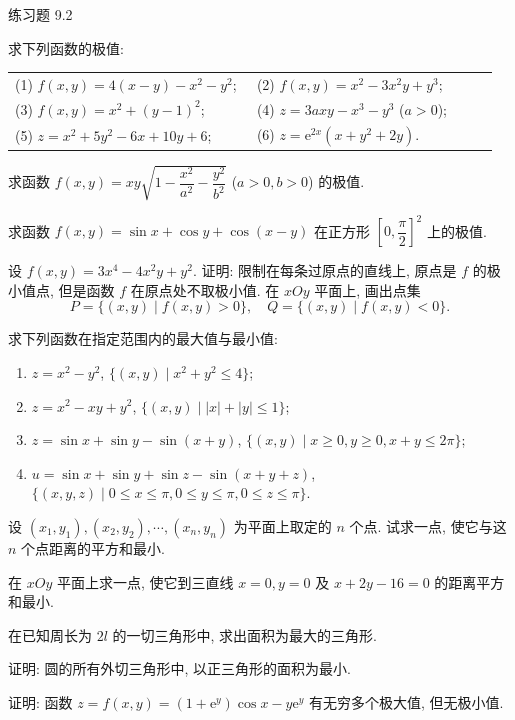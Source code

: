 \begin{exblock}{练习题 9.2}
  \item 求下列函数的极值:

  \begin{tabular}{@{}p{0.48\linewidth}p{0.48\linewidth}@{}}
    (1) $f(x, y) = 4(x - y) - x^{2} - y^{2}$; & (2) $f(x, y) = x^{2} - 3x^{2}y + y^{3}$; \\[4pt]
    (3) $f(x, y) = x^{2} + (y - 1)^{2}$; & (4) $z = 3axy - x^{3} - y^{3}$ ($a > 0$); \\[4pt]
    (5) $z = x^{2} + 5y^{2} - 6x + 10y + 6$; & (6) $z = \mathrm{e}^{2x}(x + y^{2} + 2y)$.
  \end{tabular}

  \item 求函数 $f(x, y) = xy \sqrt{1 - \dfrac{x^{2}}{a^{2}} - \dfrac{y^{2}}{b^{2}}}$ ($a > 0, b > 0$) 的极值.

  \item 求函数 $f(x, y) = \sin x + \cos y + \cos(x - y)$ 在正方形 $\left[0, \dfrac{\pi}{2}\right]^{2}$ 上的极值.

  \item 设 $f(x, y) = 3x^{4} - 4x^{2}y + y^{2}$. 证明: 限制在每条过原点的直线上, 原点是 $f$ 的极小值点, 但是函数 $f$ 在原点处不取极小值. 在 $xOy$ 平面上, 画出点集
  \[
    P = \{(x, y) \mid f(x, y) > 0\}, \quad Q = \{(x, y) \mid f(x, y) < 0\}.
  \]

  \item 求下列函数在指定范围内的最大值与最小值:
  \begin{enumerate}
    \item $z = x^{2} - y^{2}$, $\{(x, y) \mid x^{2} + y^{2} \leqslant 4\}$;
    \item $z = x^{2} - xy + y^{2}$, $\{(x, y) \mid |x| + |y| \leqslant 1\}$;
    \item $z = \sin x + \sin y - \sin(x + y)$, $\{(x, y) \mid x \geqslant 0, y \geqslant 0, x + y \leqslant 2\pi\}$;
    \item $u = \sin x + \sin y + \sin z - \sin(x + y + z)$, $\{(x, y, z) \mid 0 \leqslant x \leqslant \pi, 0 \leqslant y \leqslant \pi, 0 \leqslant z \leqslant \pi\}$.
  \end{enumerate}

  \item 设 $(x_{1}, y_{1}), (x_{2}, y_{2}), \cdots, (x_{n}, y_{n})$ 为平面上取定的 $n$ 个点. 试求一点, 使它与这 $n$ 个点距离的平方和最小.

  \item 在 $xOy$ 平面上求一点, 使它到三直线 $x = 0, y = 0$ 及 $x + 2y - 16 = 0$ 的距离平方和最小.

  \item 在已知周长为 $2l$ 的一切三角形中, 求出面积为最大的三角形.

  \item 证明: 圆的所有外切三角形中, 以正三角形的面积为最小.

  \item 证明: 函数 $z = f(x, y) = (1 + \mathrm{e}^{y}) \cos x - y\mathrm{e}^{y}$ 有无穷多个极大值, 但无极小值.
\end{exblock}
